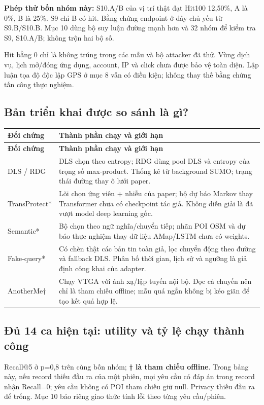 \documentclass[10pt,a4paper]{article}
\begin{document}
\textbf{Phép thử bốn nhóm này:} S10.A/B của vị trí thật đạt Hit100 12,50\%, A là 0\%, B là 25\%. S9 chỉ B có hit. Bằng chứng endpoint ở đây chủ yếu từ S9.B/S10.B. Mục 10 dùng bộ suy luận đường mạnh hơn và 32 nhóm để kiểm tra S9, S10.A/B; không trộn hai bộ số.

Hit bằng 0 chỉ là không trúng trong các mẫu và bộ attacker đã thử. Vùng dịch vụ, lịch mở/đóng ứng dụng, account, IP và click chưa được bảo vệ toàn diện. Lập luận tọa độ độc lập GPS ở mục 8 vẫn có điều kiện; không thay thế bằng chứng tấn công thực nghiệm.

\subsection{Bản triển khai được so sánh là gì?}
\begingroup\small
\begin{longtable}{@{}P{3.804cm}P{13.115cm}@{}}
\toprule
\textbf{Đối chứng} & \textbf{Thành phần chạy và giới hạn}\\\midrule
\endfirsthead
\toprule
\textbf{Đối chứng} & \textbf{Thành phần chạy và giới hạn}\\\midrule
\endhead
\bottomrule\endfoot
DLS / RDG & DLS chọn theo entropy; RDG dùng pool DLS và entropy của trọng số max-product. Thống kê từ background SUMO; trạng thái đường thay ô lưới paper.\\
\addlinespace[3pt]
TransProtect* & Lõi chọn ứng viên + nhiễu của paper; bộ dự báo Markov thay Transformer chưa có checkpoint tác giả. Không diễn giải là đã vượt model deep learning gốc.\\
\addlinespace[3pt]
Semantic* & Bộ chọn theo ngữ nghĩa/chuyển tiếp; nhãn POI OSM và dự báo thực nghiệm thay dữ liệu AMap/LSTM chưa có weights.\\
\addlinespace[3pt]
Fake-query* & Có chèn thật các bản tin toàn giả, lọc chuyển động theo đường và fallback DLS. Phân bố thời gian, lịch sử và ngưỡng là giả định công khai của adapter.\\
\addlinespace[3pt]
AnotherMe† & Chạy VTGA với ánh xạ/lập tuyến nội bộ. Đọc cả chuyến nên chỉ là tham chiếu offline; mẫu quá ngắn không bị kéo giãn để tạo kết quả hợp lệ.\\
\end{longtable}
\endgroup

\clearpage
\subsection{Đủ 14 ca hiện tại: utility và tỷ lệ chạy thành công}
Recall@5 ở p=0,8 trên cùng bốn nhóm; \textbf{† là tham chiếu offline}. Trong bảng này, nếu record thiếu đầu ra của một phiên, mọi yêu cầu có đáp án trong record nhận Recall=0; yêu cầu không có POI tham chiếu giữ null. Privacy thiếu đầu ra để trống. Mục 10 báo riêng giao thức tính lỗi theo từng yêu cầu/phiên.
\end{document}
